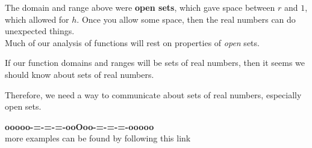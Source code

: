 \documentclass{ximera}
\begin{document}
The domain and range above were \textbf{\textcolor{purple!85!blue}{open sets}}, which gave space between $r$ and $1$, which allowed for $h$. Once you allow some space, then the real numbers can do unexpected things.\\

Much of our analysis of functions will rest on properties of \textit{open} sets. \


If our function domains and ranges will be sets of real numbers, then it seems we should know about sets of real numbers.

Therefore, we need a way to communicate about sets of real numbers, especially open sets.















\begin{center}
\textbf{\textcolor{green!50!black}{ooooo-=-=-=-ooOoo-=-=-=-ooooo}} \\

more examples can be found by following this link\\ 

\end{center}
\end{document}
